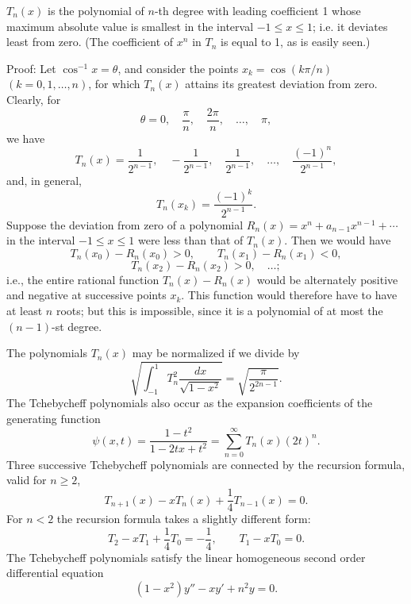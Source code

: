 $T_n(x)$ is the polynomial of $n$-th degree with leading coefficient 1 whose maximum absolute value is smallest in the interval $-1\le x\le1$; i.e. it deviates least from zero. (The coefficient of $x^n$ in $T_n$ is equal to 1, as is easily seen.)

Proof: Let $\cos^{-1}x=\theta$, and consider the points $x_k=\cos(k\pi/n)$ $(k=0,1,\ldots,n)$, for which $T_n(x)$ attains its greatest deviation from zero. Clearly, for
\[
\theta=0,\quad \frac\pi n,\quad\frac{2\pi}{n},\quad\ldots,\quad\pi,
\]
we have
\[
T_n(x)=\frac{1}{2^{n-1}},\quad -\frac{1}{2^{n-1}},\quad
\frac{1}{2^{n-1}},\quad\ldots,\quad\frac{(-1)^n}{2^{n-1}},
\]
and, in general,
\[
T_n(x_k)=\frac{(-1)^k}{2^{n-1}}.
\]
Suppose the deviation from zero of a polynomial $R_n(x)=x^n+a_{n-1}x^{n-1}+\cdots$ in the interval $-1\le x\le1$ were less than that of $T_n(x)$. Then we would have
\[
T_n(x_0)-R_n(x_0)>0,\qquad T_n(x_1)-R_n(x_1)<0,
\]
\[
T_n(x_2)-R_n(x_2)>0,\quad\ldots;
\]
i.e., the entire rational function $T_n(x)-R_n(x)$ would be alternately positive and negative at successive points $x_k$. This function would therefore have to have at least $n$ roots; but this is impossible, since it is a polynomial of at most the $(n-1)$-st degree.

The polynomials $T_n(x)$ may be normalized if we divide by
\[
\sqrt{\int_{-1}^{1}T_n^2\frac{dx}{\sqrt{1-x^2}}}
=\sqrt{\frac{\pi}{2^{2n-1}}}.
\]
The Tchebycheff polynomials also occur as the expansion coefficients of the generating function
\begin{equation}
\psi(x,t)=\frac{1-t^2}{1-2tx+t^2}=\sum_{n=0}^{\infty}T_n(x)(2t)^n.
\tag{21}
\end{equation}
Three successive Tchebycheff polynomials are connected by the recursion formula, valid for $n\ge2$,
\begin{equation}
T_{n+1}(x)-xT_n(x)+\frac14T_{n-1}(x)=0.
\tag{22}
\end{equation}
For $n<2$ the recursion formula takes a slightly different form:
\[
T_2-xT_1+\frac14T_0=-\frac14,
\qquad
T_1-xT_0=0.
\]
The Tchebycheff polynomials satisfy the linear homogeneous second order differential equation
\begin{equation}
(1-x^2)y''-xy'+n^2y=0.
\tag{23}
\end{equation}

